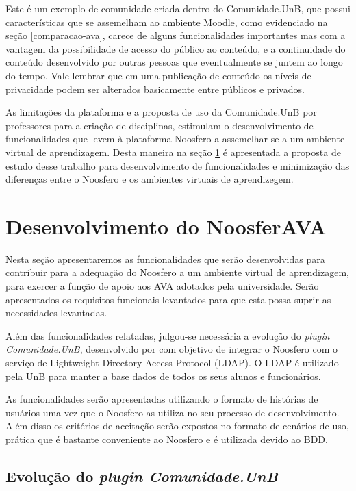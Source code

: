 Este é um exemplo de comunidade criada dentro do Comunidade.UnB, que possui características que se assemelham ao ambiente Moodle, como evidenciado na seção \ref{comparacao-ava}, carece de alguns funcionalidades importantes mas com a vantagem da possibilidade de acesso do público ao conteúdo, e a continuidade do conteúdo desenvolvido por outras pessoas que eventualmente se juntem ao longo do tempo. Vale lembrar que em uma publicação de conteúdo os níveis de privacidade podem ser alterados basicamente entre públicos e privados.

As limitações da plataforma e a proposta de uso da Comunidade.UnB por professores para a criação de disciplinas, estimulam o desenvolvimento de funcionalidades que levem à plataforma Noosfero a assemelhar-se a um ambiente virtual de aprendizagem. Desta maneira na seção \ref{desen-noosferAVA} é apresentada a proposta de estudo desse trabalho para desenvolvimento de funcionalidades e minimização das diferenças entre o Noosfero e os ambientes virtuais de aprendizegem.

\section{Desenvolvimento do NoosferAVA}
\label{desen-noosferAVA}

Nesta seção apresentaremos as funcionalidades que serão desenvolvidas para contribuir para a adequação do Noosfero a um ambiente virtual de aprendizagem, para exercer a função de apoio aos AVA adotados pela universidade. Serão apresentados os requisitos funcionais levantados para que esta possa suprir as necessidades levantadas.

Além das funcionalidades relatadas, julgou-se necessária a evolução do \textit{plugin Comunidade.UnB}, desenvolvido por  com objetivo de integrar o Noosfero com o serviço de Lightweight Directory Access Protocol (LDAP). O LDAP é utilizado pela UnB para manter a base dados de todos os seus alunos e funcionários.

As funcionalidades serão apresentadas utilizando o formato de histórias de usuários uma vez que o Noosfero as utiliza no seu processo de desenvolvimento. Além disso os critérios de aceitação serão expostos no formato de cenários de uso, prática que é bastante conveniente ao Noosfero e é utilizada devido ao BDD.

\subsection{Evolução do \textit{plugin Comunidade.UnB}}
\label{plugin-comunidade}


